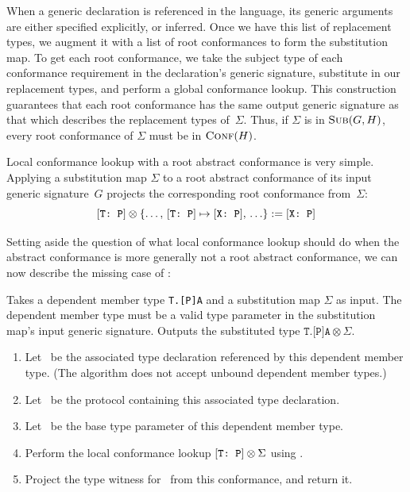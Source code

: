 \documentclass[../generics]{subfiles}
\begin{document}
When a generic declaration is referenced in the language, its generic arguments are either specified explicitly, or inferred. Once we have this list of replacement types, we augment it with a list of root conformances to form the substitution map. To get each root conformance, we take the subject type of each conformance requirement in the declaration's generic signature, substitute in our replacement types, and perform a global conformance lookup. This construction guarantees that each root conformance has the same output generic signature as that which describes the replacement types of~$\Sigma$. Thus, if $\Sigma$ is in $\textsc{Sub}({G, H})$, every root conformance of $\Sigma$ must be in $\textsc{Conf}({H})$.

Local conformance lookup with a root abstract conformance is very simple. Applying a substitution map $\Sigma$ to a root abstract conformance of its input generic signature~$G$ projects the corresponding root conformance from~$\Sigma$:
\[ [\texttt{T:~P}] \otimes \{\ldots,\, [\texttt{T:~P}] \mapsto [\texttt{X:~P}],\, \ldots\} := [\texttt{X:~P}] \]

Setting aside the question of what local conformance lookup should do when the abstract conformance is more generally not a root abstract conformance, we can now describe the missing case of :
\begin{algorithm}\label{dependent member type substitution}
Takes a dependent member type \texttt{T.[P]A} and a substitution map $\Sigma$ as input. The dependent member type must be a valid type parameter in the substitution map's input generic signature. Outputs the substituted type $\texttt{T.[P]A}\otimes\Sigma$.
\begin{enumerate}
\item Let \nA\ be the associated type declaration referenced by this dependent member type. (The algorithm does not accept unbound dependent member types.)
\item Let \tP\ be the protocol containing this associated type declaration.
\item Let \tT\ be the base type parameter of this dependent member type.
\item Perform the local conformance lookup $[\texttt{T:~P}]\otimes\Sigma$ using .
\item Project the type witness for \nA\ from this conformance, and return it.
\end{enumerate}
\end{algorithm}
\end{document}
